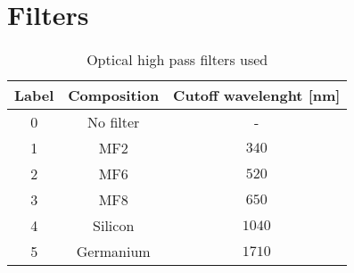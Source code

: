 \section{Filters}
\label{sec:filters}

\begin{table}[htbp]
    \centering
    \begin{tabular}{c c c}
        Label & Composition & Cutoff wavelenght [nm] \\
        \hline
        0 & No filter & - \\
        1 & MF2 & $340$ \\
        2 & MF6 & $520$ \\
        3 & MF8 & $650$ \\
        4 & Silicon & $1040$ \\
        5 & Germanium & $1710$
    \end{tabular}
    \caption{Optical high pass filters used}
    \label{tab:filters}
\end{table}
